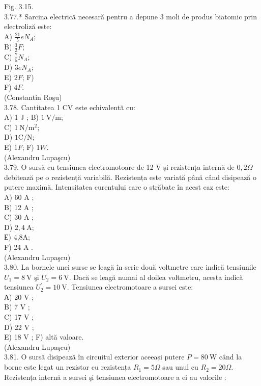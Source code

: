 \documentclass[10pt]{article}
\begin{document}
Fig. 3.15.\\
3.77.* Sarcina electrică necesară pentru a depune 3 moli de produs biatomic prin electroliză este:\\
A) $\frac{21}{5} e N_{A}$;\\
B) $\frac{3}{2} F$;\\
C) $\frac{7}{5} N_{A}$;\\
D) $3 e N_{A}$;\\
E) $2 F$; F)\\
F) $4 F$.\\
(Constantin Roşu)\\
3.78. Cantitatea 1 CV este echivalentă cu:\\
A) 1 J ; B) $1 \mathrm{~V} / \mathrm{m}$;\\
C) $1 \mathrm{~N} / \mathrm{m}^{2}$;\\
D) $1 \mathrm{C} / \mathrm{N}$;\\
E) $1 F$; F) $1 W$.\\
(Alexandru Lupaşcu)\\
3.79. O sursă cu tensiunea electromotoare de 12 V și rezistența internă de $0,2 \Omega$ debitează pe o rezistență variabilă. Rezistența este variată până când disipează o putere maximă. Intensitatea curentului care o străbate în acest caz este:\\
A) 60 A ;\\
B) 12 A ;\\
C) 30 A ;\\
D) $2,4 \mathrm{~A}$;\\
Е) 4,8A;\\
F) 24 A .\\
(Alexandru Lupaşcu)\\
3.80. La bornele unei surse se leagă în serie două voltmetre care indică tensiunile $U_{1}=8 \mathrm{~V}$ şi $U_{2}=6 \mathrm{~V}$. Dacă se leagă numai al doilea voltmetru, acesta indică tensiunea $U_{2}^{\prime}=10 \mathrm{~V}$. Tensiunea electromotoare a sursei este:\\
А) 20 V ;\\
B) 7 V ;\\
C) 17 V ;\\
D) 22 V ;\\
E) 18 V ; F) altă valoare.\\
(Alexandru Lupaşcu)\\
3.81. O sursă disipează în circuitul exterior aceeași putere $P=80 \mathrm{~W}$ când la borne este legat un rezistor cu rezistența $R_{1}=5 \Omega$ sau unul cu $R_{2}=20 \Omega$. Rezistența internă a sursei şi tensiunea electromotoare a ei au valorile :\\
\end{document}
